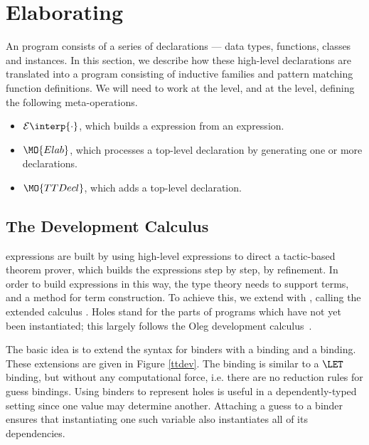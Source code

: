 \newcommand{\ttinterp}[1]{\mathcal{E}\interp{#1}}
\newcommand{\ttpinterp}[1]{\mathcal{P}\interp{#1}}
\newcommand{\uninterp}[1]{\mathcal{T}\interp{#1}}

\section{Elaborating \Idris{}}

\label{sect:elaboration}

An \Idris{} program consists of a series of declarations --- data types,
functions, classes and instances. In this section, we describe how these
high-level declarations are translated into a \TT{} program consisting of
inductive families and pattern matching function definitions. We will need to
work at the  level, and at the  level,
defining the following meta-operations.

\begin{itemize}
\item $\ttinterp{\cdot}$, which builds a \TT{} expression from an \Idris{} expression.
\item $\MO{Elab}$, which processes a top-level \Idris{} declaration by generating
one or more \TT{} declarations.
\item $\MO{TTDecl}$, which adds a top-level \TT{} declaration.
\end{itemize}


\subsection{The Development Calculus \TTdev}

\TT{} expressions are built by using high-level \Idris{} expressions to
direct a tactic-based theorem prover, which builds the \TT{} expressions
step by step, by refinement. In order to build expressions in this way,
the type theory needs to support
 terms, and a method for term construction. 
To achieve this, we extend \TT{} with ,
calling the extended calculus \TTdev{}.
Holes stand for the parts of programs which have not yet been
instantiated; this largely follows the Oleg development
calculus~\cite{McBride1999}.

The basic idea is to extend the syntax for binders with a 
binding and a  binding. 
These extensions are given in Figure \ref{ttdev}.
The  binding is
similar to a $\LET$ binding, but without any computational force,
i.e. there are no reduction rules for guess bindings. 
Using binders to represent holes is useful in a dependently-typed setting since
one value may determine another. Attaching a guess to a binder ensures that
instantiating one such variable also instantiates all of its dependencies. 

